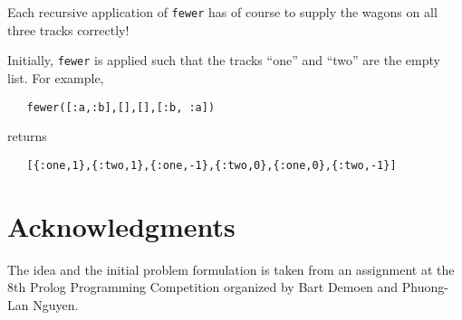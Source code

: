 \documentclass[a4paper,11pt]{article}
\begin{document}
Each recursive application of \verb+fewer+ has of course to
supply the wagons on all three tracks correctly!

Initially, \verb+fewer+ is applied such that the tracks ``one''
and ``two'' are the empty list. For example,
\begin{verbatim}
   fewer([:a,:b],[],[],[:b, :a])
\end{verbatim}
returns
\begin{verbatim}
   [{:one,1},{:two,1},{:one,-1},{:two,0},{:one,0},{:two,-1}]
\end{verbatim}

\section{Acknowledgments}

The idea and the initial problem formulation is taken from an
assignment at the 8th Prolog Programming Competition organized by Bart
Demoen and Phuong-Lan Nguyen. 
\end{document}
